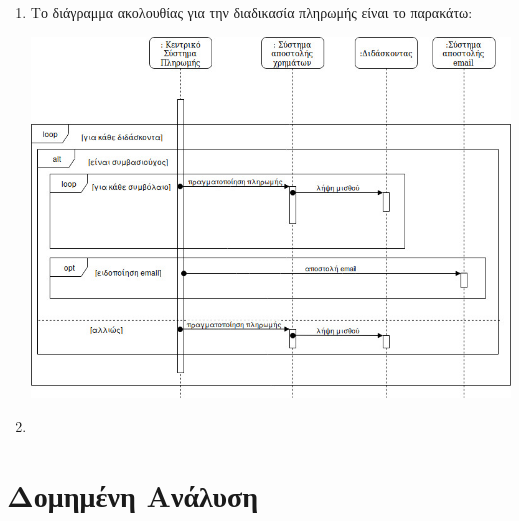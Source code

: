 \documentclass[12pt]{article}
\begin{document}
\begin{enumerate}
\item
Το διάγραμμα ακολουθίας για την διαδικασία πληρωμής είναι το παρακάτω:\\
\begin{center}
\includegraphics[scale=0.5]{sequence}
\end{center}

\item
\end{enumerate}


\section{Δομημένη Ανάλυση}
\end{document}
